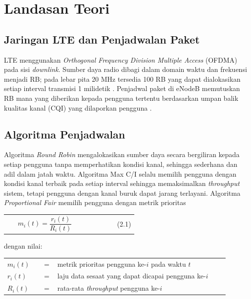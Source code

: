 \section{Landasan Teori}

\subsection{Jaringan LTE dan Penjadwalan Paket}
LTE menggunakan \textit{Orthogonal Frequency Division Multiple Access} (OFDMA) pada sisi \textit{downlink}. Sumber daya radio dibagi dalam domain waktu dan frekuensi menjadi RB; pada lebar pita 20 MHz tersedia 100 RB yang dapat dialokasikan setiap interval transmisi 1 milidetik \parencite{ghosh2010,dahlman2011}. Penjadwal paket di eNodeB memutuskan RB mana yang diberikan kepada pengguna tertentu berdasarkan umpan balik kualitas kanal (CQI) yang dilaporkan pengguna \parencite{dahlman2011}.

\subsection{Algoritma Penjadwalan}
Algoritma \textit{Round Robin} mengalokasikan sumber daya secara bergiliran kepada setiap pengguna tanpa memperhatikan kondisi kanal, sehingga sederhana dan adil dalam jatah waktu. Algoritma Max C/I selalu memilih pengguna dengan kondisi kanal terbaik pada setiap interval sehingga memaksimalkan \textit{throughput} sistem, tetapi pengguna dengan kanal buruk dapat jarang terlayani. Algoritma \textit{Proportional Fair} memilih pengguna dengan metrik prioritas

\begin{tanpagaris}
\begin{longtable}{@{}p{0.08\linewidth}p{0.76\linewidth}r@{}}
 & $m_{i}(t)=\dfrac{r_{i}(t)}{R_{i}(t)}$ & (2.1) \\
\end{longtable}
\end{tanpagaris}

dengan nilai:

\begin{tanpagaris}
\begin{longtable}{@{}p{0.15\linewidth}p{0.05\linewidth}p{0.7\linewidth}@{}}
$m_{i}(t)$ & = & metrik prioritas pengguna ke-$i$ pada waktu $t$ \\
$r_{i}(t)$ & = & laju data sesaat yang dapat dicapai pengguna ke-$i$ \\
$R_{i}(t)$ & = & rata-rata \textit{throughput} pengguna ke-$i$ \\
\end{longtable}
\end{tanpagaris}

